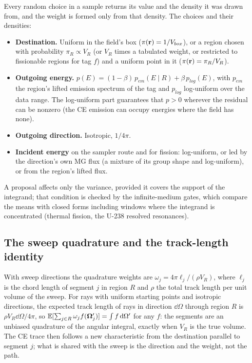 Every random choice in a sample returns its value and the density it was drawn from, and the weight
is formed only from that density. The choices and their densities:
\begin{itemize}
\item \textbf{Destination.} Uniform in the field's box ($\pi(\mathbf r)=1/V_{box}$), or a region chosen with
  probability $\pi_R\propto V_R$ (or $V_R$ times a tabulated weight, or restricted to fissionable
  regions for tag $f$) and a uniform point in it ($\pi(\mathbf r)=\pi_R/V_R$).
\item \textbf{Outgoing energy.} $p(E)=(1-\beta)\,p_{em}(E\mid R)+\beta\,p_{log}(E)$, with $p_{em}$ the
  region's lifted emission spectrum of the tag and $p_{log}$ log-uniform over the data range. The
  log-uniform part guarantees that $p>0$ wherever the residual can be nonzero (the CE emission can
  occupy energies where the field has none).
\item \textbf{Outgoing direction.} Isotropic, $1/4\pi$.
\item \textbf{Incident energy} on the sampler route and for fission: log-uniform, or led by the
  direction's own MG flux (a mixture of its group shape and log-uniform), or from the region's lifted
  flux.
\end{itemize}
A proposal affects only the variance, provided it covers the support of the integrand; that condition
is checked by the infinite-medium gates, which compare the means with closed forms including windows
where the integrand is concentrated (thermal fission, the U-238 resolved resonances).

\subsection{The sweep quadrature and the track-length identity}

With sweep directions the quadrature weights are $\omega_j=4\pi\ell_j/(\rho V_R)$, where $\ell_j$ is the
chord length of segment $j$ in region $R$ and $\rho$ the total track length per unit volume of the sweep.
For rays with uniform starting points and isotropic directions, the expected track length of rays in
direction $\dd\Omega$ through region $R$ is $\rho V_R\dd\Omega/4\pi$, so
$\mathbb E[\sum_{j\in R}\omega_jf(\boldsymbol\Omega'_j)]=\int f\,\mathrm d\Omega'$ for any $f$: the segments are an unbiased
quadrature of the angular integral, exactly when $V_R$ is the true volume. The CE trace then follows a
new characteristic from the destination parallel to segment $j$; what is shared with the sweep is the
direction and the weight, not the path.

